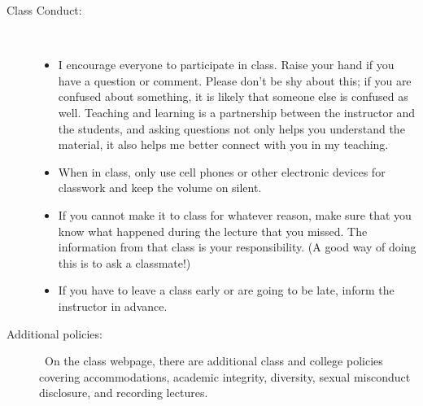 \documentclass [letterpaper,11pt]{article}
\begin{document}
\begin{description}
\item[Class Conduct:] \
   \begin{itemize}\setlength{\itemsep}{0em}\setlength{\parskip}{0pt}
   	\item I encourage everyone to participate in class.  Raise your hand if you have
	a question or comment.  Please don't be shy about this; if you are confused about
	something, it is likely that someone else is confused as well.
		Teaching and learning is a partnership between the instructor and the students, and asking questions not only helps you understand the material, it also helps me better connect with you in my teaching.
	\item When in class, only use cell phones or other electronic devices for classwork and keep the volume on silent.
	\item  If you cannot make it to class for whatever reason, make sure that you know what happened during the lecture that you missed. The information from that class is your responsibility. (A good way of doing this is to ask a classmate!)
     \item  If you have to leave a class early or are going to be late, inform the instructor in advance. 
     \end{itemize}
     
\item[Additional policies:] \
On the class webpage, there are additional class and college policies covering accommodations, academic integrity, diversity, sexual misconduct disclosure, and recording lectures.  
   
   
\end{description}

   
\end{document}
